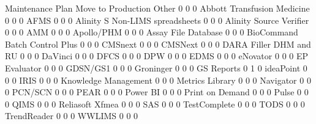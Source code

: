 \documentclass{article}
\begin{document}
\begin{Schunk}
\begin{Soutput}
                                  Maintenance Plan Move to Production Other
                                                 0                  0     0
  Abbott Transfusion Medicine                    0                  0     0
  AFMS                                           0                  0     0
  Alinity S Non-LIMS spreadsheets                0                  0     0
  Alinity Source Verifier                        0                  0     0
  AMM                                            0                  0     0
  Apollo/PHM                                     0                  0     0
  Assay File Database                            0                  0     0
  BioCommand Batch Control Plus                  0                  0     0
  CMSnext                                        0                  0     0
  CMSNext                                        0                  0     0
  DARA Filler DHM and RU                         0                  0     0
  DaVinci                                        0                  0     0
  DFCS                                           0                  0     0
  DPW                                            0                  0     0
  EDMS                                           0                  0     0
  eNovator                                       0                  0     0
  EP Evaluator                                   0                  0     0
  GDSN/GS1                                       0                  0     0
  Groninger                                      0                  0     0
  GS Reports                                     0                  1     0
  ideaPoint                                      0                  0     0
  IRIS                                           0                  0     0
  Knowledge Management                           0                  0     0
  Metrics Library                                0                  0     0
  Navigator                                      0                  0     0
  PCN/SCN                                        0                  0     0
  PEAR                                           0                  0     0
  Power BI                                       0                  0     0
  Print on Demand                                0                  0     0
  Pulse                                          0                  0     0
  QIMS                                           0                  0     0
  Reliasoft Xfmea                                0                  0     0
  SAS                                            0                  0     0
  TestComplete                                   0                  0     0
  TODS                                           0                  0     0
  TrendReader                                    0                  0     0
  WWLIMS                                         0                  0     0
                                 

\end{Soutput}
\end{Schunk}
\end{document}
